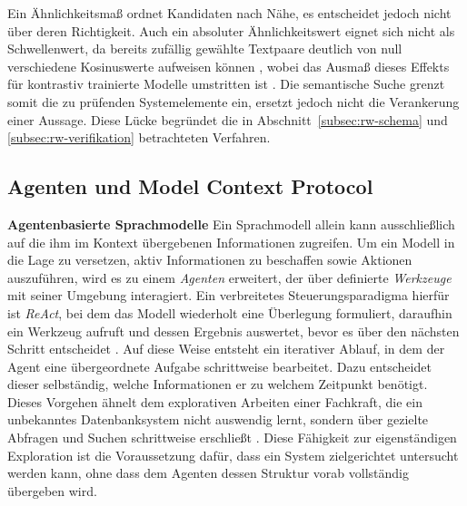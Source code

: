 Ein Ähnlichkeitsmaß ordnet Kandidaten nach Nähe, es entscheidet jedoch nicht über deren Richtigkeit. Auch ein absoluter Ähnlichkeitswert eignet sich nicht als Schwellenwert, da bereits zufällig gewählte Textpaare deutlich von null verschiedene Kosinuswerte aufweisen können \cite{ethayarajh_how_2019}, wobei das Ausmaß dieses Effekts für kontrastiv trainierte Modelle umstritten ist \cite{gao_simcse_2022}. Die semantische Suche grenzt somit die zu prüfenden Systemelemente ein, ersetzt jedoch nicht die Verankerung einer Aussage. Diese Lücke begründet die in Abschnitt~\ref{subsec:rw-schema} und \ref{subsec:rw-verifikation} betrachteten Verfahren.

\subsection{Agenten und Model Context Protocol}
\label{subsec:agenten-mcp}

\textbf{Agentenbasierte Sprachmodelle}
Ein Sprachmodell allein kann ausschließlich auf die ihm im Kontext übergebenen Informationen zugreifen. Um ein Modell in die Lage zu versetzen, aktiv Informationen zu beschaffen sowie Aktionen auszuführen, wird es zu einem \emph{Agenten} erweitert, der über definierte \emph{Werkzeuge} mit seiner Umgebung interagiert. Ein verbreitetes Steuerungsparadigma hierfür ist \emph{ReAct}, bei dem das Modell wiederholt eine Überlegung formuliert, daraufhin ein Werkzeug aufruft und dessen Ergebnis auswertet, bevor es über den nächsten Schritt entscheidet \cite{yao_react_2023}. Auf diese Weise entsteht ein iterativer Ablauf, in dem der Agent eine übergeordnete Aufgabe schrittweise bearbeitet. Dazu entscheidet dieser selbständig,  welche Informationen er zu welchem Zeitpunkt benötigt. Dieses Vorgehen ähnelt dem explorativen Arbeiten einer Fachkraft, die ein unbekanntes Datenbanksystem nicht auswendig lernt, sondern über gezielte Abfragen und Suchen schrittweise erschließt \cite{wang_autolink_2026}. Diese Fähigkeit zur eigenständigen Exploration ist die Voraussetzung dafür, dass ein System zielgerichtet untersucht werden kann, ohne dass dem Agenten dessen Struktur vorab vollständig übergeben wird.

